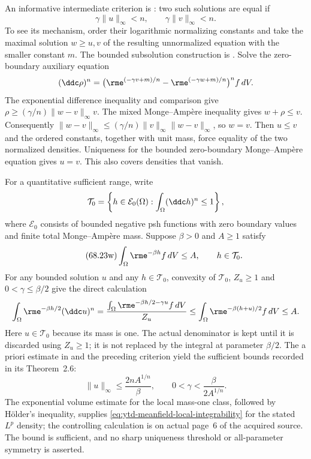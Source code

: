 An informative intermediate criterion is
\cite[Lemma~2.3]{LuPhung25MeanFieldV1}: two such solutions are
equal if
\[
\tag{68.23v}\label{eq:ytd-meanfield-local-criterion}
 \gamma\|u\|_\infty<n,
 \qquad\gamma\|v\|_\infty<n.
\]
To see its mechanism, order their logarithmic normalizing constants
and take the maximal solution $w\geq u,v$ of the resulting
unnormalized equation with the smaller constant $m$.
The bounded subsolution construction is
\cite[Lemma~2.2]{LuPhung25MeanFieldV1}.
Solve the zero-boundary auxiliary equation
\[
 (\ddc\rho)^n
  =\bigl(\rme^{(-\gamma v+m)/n}
               -\rme^{(-\gamma w+m)/n}\bigr)^n f\,dV.
\]
The exponential difference inequality and comparison give
$\rho\geq (\gamma/n)\|w-v\|_\infty v$.
The mixed Monge--Amp\`ere inequality gives $w+\rho\leq v$.
Consequently
$\|w-v\|_\infty\leq
 (\gamma/n)\|v\|_\infty\|w-v\|_\infty$, so $w=v$.
Then $u\leq v$ and the ordered constants, together with unit
mass, force equality of the two normalized densities.
Uniqueness for the bounded zero-boundary Monge--Amp\`ere
equation gives $u=v$. This also covers densities that vanish.

For a quantitative sufficient range, write
\[
 \mathcal T_0
  =\left\{h\in\mathcal E_0(\Omega):
                      \int_\Omega(\ddc h)^n\leq1\right\},
\]
where $\mathcal E_0$ consists of bounded negative psh functions
with zero boundary values and finite total Monge--Amp\`ere mass.
Suppose $\beta>0$ and $A\geq1$ satisfy
\[
\tag{68.23w}\label{eq:ytd-meanfield-local-integrability}
 \int_\Omega\rme^{-\beta h}f\,dV\leq A,
 \qquad h\in\mathcal T_0.
\]
For any bounded solution $u$ and any $h\in\mathcal T_0$,
convexity of $\mathcal T_0$, $Z_u\geq1$ and
$0<\gamma\leq\beta/2$ give the direct calculation
\[
 \int_\Omega\rme^{-\beta h/2}(\ddc u)^n
 =\frac{\int_\Omega\rme^{-\beta h/2-\gamma u}f\,dV}{Z_u}
 \leq\int_\Omega\rme^{-\beta(h+u)/2}f\,dV
 \leq A.
\]
Here $u\in\mathcal T_0$ because its mass is one. The actual
denominator is kept until it is discarded using $Z_u\geq1$;
it is not replaced by the integral at parameter $\beta/2$.
The a priori estimate in
\cite[Theorem~2.5]{LuPhung25MeanFieldV1} and the preceding
criterion yield the sufficient bounds recorded in its Theorem~2.6:
\[
\tag{68.23x}\label{eq:ytd-meanfield-local-small-range}
 \|u\|_\infty\leq\frac{2nA^{1/n}}{\beta},
 \qquad
 0<\gamma<\frac{\beta}{2A^{1/n}}.
\]
The exponential volume estimate for the local mass-one class,
followed by H\"older's inequality, supplies
\eqref{eq:ytd-meanfield-local-integrability} for the stated
$L^p$ density; the controlling calculation is on actual page~6
of the acquired source. The bound is sufficient, and no sharp
uniqueness threshold or all-parameter symmetry is asserted.

